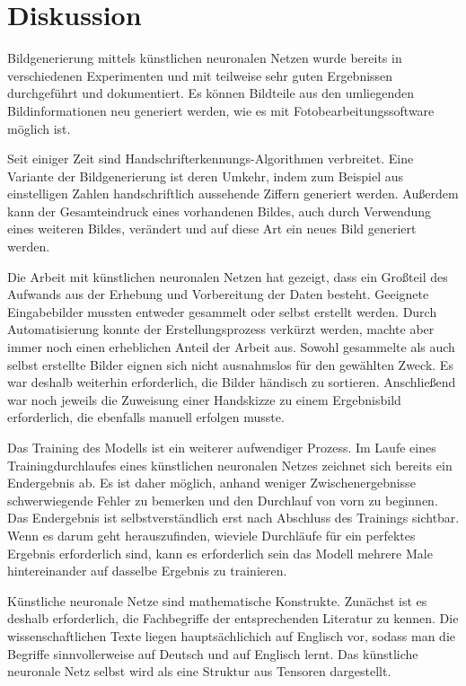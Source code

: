 \chapter{Diskussion}
\label{sec:conclusion}
Bildgenerierung mittels künstlichen neuronalen Netzen wurde bereits in verschiedenen Experimenten und mit teilweise sehr guten Ergebnissen durchgeführt und dokumentiert. Es können Bildteile aus den umliegenden Bildinformationen neu generiert werden, wie es mit Fotobearbeitungssoftware möglich ist.

Seit einiger Zeit sind Handschrifterkennungs-Algorithmen verbreitet. Eine Variante der Bildgenerierung ist deren Umkehr, indem zum Beispiel aus einstelligen Zahlen handschriftlich aussehende Ziffern generiert werden. Außerdem kann der Gesamteindruck eines vorhandenen Bildes, auch durch Verwendung eines weiteren Bildes, verändert und auf diese Art ein neues Bild generiert werden.

Die Arbeit mit künstlichen neuronalen Netzen hat gezeigt, dass ein Großteil des Aufwands aus der Erhebung und Vorbereitung der Daten besteht. Geeignete Eingabebilder mussten entweder gesammelt oder selbst erstellt werden. Durch Automatisierung konnte der Erstellungsprozess verkürzt werden, machte aber immer noch einen erheblichen Anteil der Arbeit aus. Sowohl gesammelte als auch selbst erstellte Bilder eignen sich nicht ausnahmslos für den gewählten Zweck. Es war deshalb weiterhin erforderlich, die Bilder händisch zu sortieren. Anschließend war noch jeweils die Zuweisung einer Handskizze zu einem Ergebnisbild erforderlich, die ebenfalls manuell erfolgen musste.

Das Training des Modells ist ein weiterer aufwendiger Prozess. Im Laufe eines Trainingdurchlaufes eines künstlichen neuronalen Netzes zeichnet sich bereits ein Endergebnis ab. Es ist daher möglich, anhand weniger Zwischenergebnisse schwerwiegende Fehler zu bemerken und den Durchlauf von vorn zu beginnen. Das Endergebnis ist selbstverständlich erst nach Abschluss des Trainings sichtbar. Wenn es darum geht herauszufinden, wieviele Durchläufe für ein perfektes Ergebnis erforderlich sind, kann es erforderlich sein das Modell mehrere Male hintereinander auf dasselbe Ergebnis zu trainieren.

Künstliche neuronale Netze sind mathematische Konstrukte. Zunächst ist es deshalb erforderlich, die Fachbegriffe der entsprechenden Literatur zu kennen. Die wissenschaftlichen Texte liegen hauptsächlichich auf Englisch vor, sodass man die Begriffe sinnvollerweise auf Deutsch und auf Englisch lernt. Das künstliche neuronale Netz selbst wird als eine Struktur aus Tensoren dargestellt.

